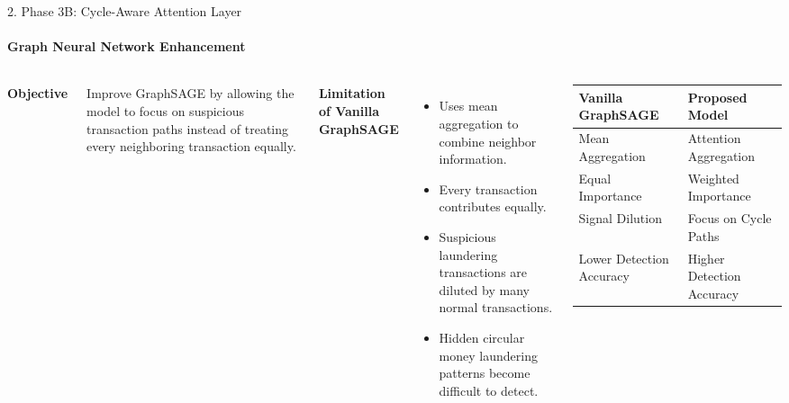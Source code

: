 \documentclass[aspectratio=169,11pt]{beamer}
\begin{document}
\begin{frame}{2. Phase 3B: Cycle-Aware Attention Layer}

\framesubtitle{Graph Neural Network Enhancement}

\begin{columns}[T]


{\footnotesize
\textbf{Objective}

Improve GraphSAGE by allowing the model to focus on suspicious transaction paths instead of treating every neighboring transaction equally.

\vspace{0.15cm}

\textbf{Limitation of Vanilla GraphSAGE}

\begin{itemize}\setlength{\itemsep}{1.5pt}\setlength{\parskip}{0pt}

\item Uses mean aggregation to combine neighbor information.

\item Every transaction contributes equally.

\item Suspicious laundering transactions are diluted by many normal transactions.

\item Hidden circular money laundering patterns become difficult to detect.

\end{itemize}
}


\centering

\renewcommand{\arraystretch}{1.08}
\scriptsize

\begin{tabular}{|p{2.6cm}|p{2.6cm}|}
\hline
\textbf{Vanilla GraphSAGE} & \textbf{Proposed Model} \\
\hline
Mean Aggregation & Attention Aggregation \\
\hline
Equal Importance & Weighted Importance \\
\hline
Signal Dilution & Focus on Cycle Paths \\
\hline
Lower Detection Accuracy & Higher Detection Accuracy \\
\hline
\end{tabular}


\end{columns}
\end{frame}
\end{document}
